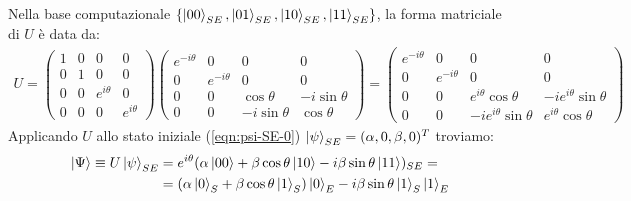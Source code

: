 \documentclass[../../InformazioneQuantistica.tex]{subfiles}
\begin{document}
Nella base computazionale $\{\Ket{00}_{SE}, \Ket{01}_{SE}, \Ket{10}_{SE}, \Ket{11}_{SE}\}$, la forma matriciale di $U$ è data da:
\begin{align*}
U=\left(
\begin{array}{cc|cc}
1 & 0 & 0 & 0\\
0 & 1 & 0 & 0\\ \hline
0 & 0 & e^{i\theta} & 0\\
0 & 0 & 0 & e^{i\theta}
\end{array}
\right)
\left(
\begin{array}{cc|cc}
e^{-i\theta} & 0 & 0 & 0\\
0 & e^{-i\theta} & 0 & 0\\ \hline
0 & 0 & \cos\theta & -i\sin\theta\\
0 & 0 & -i\sin\theta & \cos\theta
\end{array}
\right)= \left(
\begin{array}{cc|cc}
e^{-i\theta} & 0 & 0 & 0\\
0 & e^{-i\theta} & 0 & 0\\ \hline
0 & 0 & e^{i\theta}\cos\theta & -i e^{i\theta}\sin\theta\\
0 & 0 & -i e^{i\theta}\sin\theta & e^{i\theta}\cos\theta
\end{array} \right)
\end{align*}
Applicando $U$ allo stato iniziale (\ref{eqn:psi-SE-0}) $\Ket{\psi}_{SE} = (\alpha, 0, \beta, 0)^T$ troviamo:
\begin{align*}
\Ket{\Psi} \equiv U\Ket{\psi}_{SE} &= e^{i\theta}(\alpha \Ket{00}+\beta \cos\theta \Ket{10}-i\beta \sin\theta \Ket{11})_{SE} = \\
&= \left(\alpha \Ket{0}_S + \beta \cos\theta \Ket{1}_S\right)\Ket{0}_E - i \beta \sin\theta \Ket{1}_S \Ket{1}_E
\end{align*}
\end{document}
